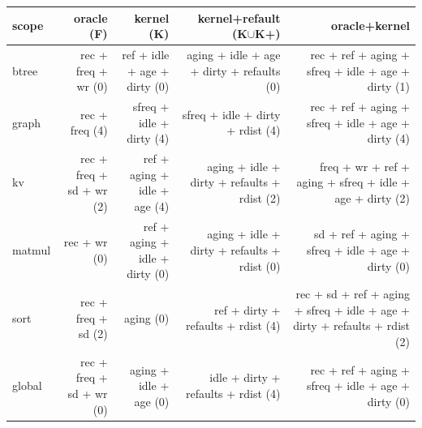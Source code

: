 \begin{tabular}{lrrrr}
\toprule
scope & oracle (F) & kernel (K) & kernel{+}refault (K$\cup$K{+}) & oracle{+}kernel \\
\midrule
btree & rec {+} freq {+} wr (0) & ref {+} idle {+} age {+} dirty (0) & aging {+} idle {+} age {+} dirty {+} refaults (0) & rec {+} ref {+} aging {+} sfreq {+} idle {+} age {+} dirty (1) \\
graph & rec {+} freq (4) & sfreq {+} idle {+} dirty (4) & sfreq {+} idle {+} dirty {+} rdist (4) & rec {+} ref {+} aging {+} sfreq {+} idle {+} age {+} dirty (4) \\
kv & rec {+} freq {+} sd {+} wr (2) & ref {+} aging {+} idle {+} age (4) & aging {+} idle {+} dirty {+} refaults {+} rdist (2) & freq {+} wr {+} ref {+} aging {+} sfreq {+} idle {+} age {+} dirty (2) \\
matmul & rec {+} wr (0) & ref {+} aging {+} idle {+} dirty (0) & aging {+} idle {+} dirty {+} refaults {+} rdist (0) & sd {+} ref {+} aging {+} sfreq {+} idle {+} age {+} dirty (0) \\
sort & rec {+} freq {+} sd (2) & aging (0) & ref {+} dirty {+} refaults {+} rdist (4) & rec {+} sd {+} ref {+} aging {+} sfreq {+} idle {+} age {+} dirty {+} refaults {+} rdist (2) \\
global & rec {+} freq {+} sd {+} wr (0) & aging {+} idle {+} age (0) & idle {+} dirty {+} refaults {+} rdist (4) & rec {+} ref {+} aging {+} sfreq {+} idle {+} age {+} dirty (0) \\
\bottomrule
\end{tabular}
